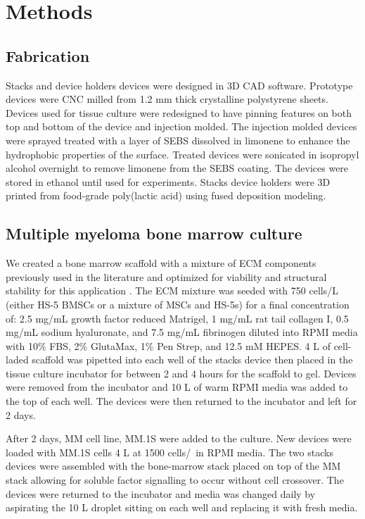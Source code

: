 \section{Methods}

\subsection{Fabrication}
Stacks and device holders devices were designed in 3D CAD software. Prototype devices were CNC milled from 1.2 mm thick crystalline polystyrene sheets. Devices used for tissue culture were redesigned to have pinning features on both top and bottom of the device and injection molded. The injection molded devices were sprayed treated with a layer of SEBS dissolved in limonene to enhance the hydrophobic properties of the surface. Treated devices were sonicated in isopropyl alcohol overnight to remove limonene from the SEBS coating. The devices were stored in ethanol until used for experiments. Stacks device holders were 3D printed from food-grade poly(lactic acid) using fused deposition modeling. 

\subsection{Multiple myeloma bone marrow culture}
We created a bone marrow scaffold with a mixture of ECM components previously used in the literature and optimized for viability and structural stability for this application \cite{Reagan2014, DiBuduo2015, Torisawa2014, Wenger2004, Morrison2014}. The ECM mixture was seeded with 750 cells/\textmu L (either HS-5 BMSCs or a mixture of MSCs and HS-5s) for a final concentration of: 2.5 mg/mL growth factor reduced Matrigel, 1 mg/mL rat tail collagen I, 0.5 mg/mL sodium hyaluronate, and 7.5 mg/mL fibrinogen diluted into RPMI media with 10\% FBS, 2\% GlutaMax, 1\% Pen Strep, and 12.5 mM HEPES. 4 \textmu L of cell-laded scaffold was pipetted into each well of the stacks device then placed in the tissue culture incubator for between 2 and 4 hours for the scaffold to gel. Devices were removed from the incubator and 10 \textmu L of warm RPMI media was added to the top of each well. The devices were then returned to the incubator and left for 2 days. 

After 2 days, MM cell line, MM.1S were added to the culture. New devices were loaded with MM.1S cells 4 \textmu L at 1500 cells/\textmu\ in RPMI media. The two stacks devices were assembled with the bone-marrow stack placed on top of the MM stack allowing for soluble factor signalling to occur without cell crossover. The devices were returned to the incubator and media was changed daily by aspirating the 10 \textmu L droplet sitting on each well and replacing it with fresh media. 

